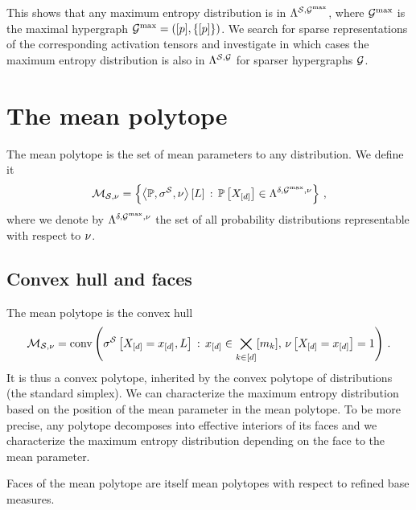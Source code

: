 \documentclass[aps,onecolumn,nofootinbib,pra]{article}
\begin{document}
    This shows that any maximum entropy distribution is in $\Lambda^{\mathcal{S},\mathcal{G}^{\mathrm{max}}}$, where $\mathcal{G}^{\mathrm{max}}$ is the maximal hypergraph $\mathcal{G}^{\mathrm{max}}=([p],\{[p]\})$.
    We search for sparse representations of the corresponding activation tensors and investigate in which cases the maximum entropy distribution is also in $\Lambda^{\mathcal{S},\mathcal{G}}$ for sparser hypergraphs $\mathcal{G}$.


    \section{The mean polytope}

    The mean polytope is the set of mean parameters to any distribution.
    We define it
    \begin{align*}
        \mathcal{M}_{\mathcal{S},\nu}
        = \left\{\left\langle \mathbb{P},\sigma^{\mathcal{S}},\nu\right\rangle \left[ L \right]\,:\,\mathbb{P}\left[X_{[d]}\right]\in\Lambda^{\delta,\mathcal{G}^{\mathrm{max}},\nu} \right\} \, ,
    \end{align*}
    where we denote by $\Lambda^{\delta,\mathcal{G}^{\mathrm{max}},\nu}$ the set of all probability distributions representable with respect to $\nu$.

%        

    \subsection{Convex hull and faces}

    The mean polytope is the convex hull
    \begin{align*}
        \mathcal{M}_{\mathcal{S},\nu}
        = \mathrm{conv}\left(\sigma^{\mathcal{S}}\left[X_{[d]}=x_{[d]},L\right]\,:\,x_{[d]}\in\bigtimes_{k\in[d]}[m_{k}],\,\nu\left[X_{[d]}=x_{[d]}\right]=1\right) \, .
    \end{align*}
    It is thus a convex polytope, inherited by the convex polytope of distributions (the standard simplex).
    We can characterize the maximum entropy distribution based on the position of the mean parameter in the mean polytope.
    To be more precise, any polytope decomposes into effective interiors of its faces and we characterize the maximum entropy distribution depending on the face to the mean parameter.

    Faces of the mean polytope are itself mean polytopes with respect to refined base measures.
\end{document}
